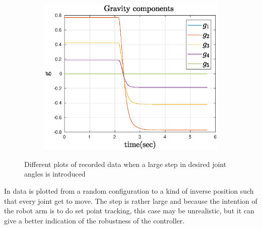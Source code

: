 \begin{figure}[htbp]
\begin{subfigure}[htbp]{0.45\textwidth}
        \caption{ }
    \end{subfigure}
    ~
    \begin{subfigure}[htbp]{0.45\textwidth}
        \centering
        \includegraphics[width = \picsSiz\linewidth]{img/LSgrav.eps}
        \caption{ }
    \end{subfigure}
    \caption{Different plots of recorded data when a large step in desired joint angles is introduced}
    \label{fig:LS}
\end{figure}
In  data is plotted from a random configuration to a kind of inverse position such that every joint get to move. The step is rather large and because the intention of the robot arm is to do set point tracking, this case may be unrealistic, but it can give a better indication of the robustness of the controller. %


